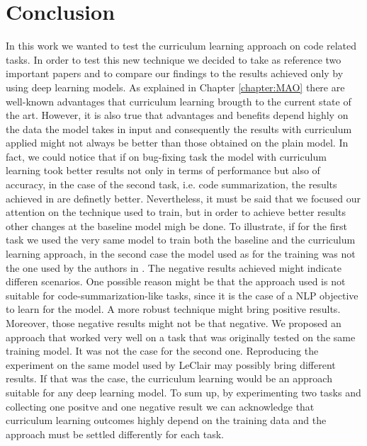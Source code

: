 \chapter{Conclusion}
In this work we wanted to test the curriculum learning approach on code related tasks.
In order to test this new technique we decided to take as reference two important papers and to compare 
our findings to the results achieved only by using deep learning models.
As explained in Chapter \ref{chapter:MAO} there are well-known advantages that curriculum learning
brougth to the current state of the art. However, it is also true that advantages and benefits depend highly on the data 
the model takes in input and consequently the results with curriculum applied might not always be better than 
those obtained on the plain model. 
In fact, we could notice that if on bug-fixing task the model with curriculum learning 
took better results not only in terms of performance but also of accuracy, 
in the case of the second task, i.e. code summarization, the results achieved in \cite{Leclair2020}
are definetly better.
Nevertheless, it must be said that we focused our attention on the technique used to train, but in order to achieve better 
results other changes at the baseline model migh be done. To illustrate, if for the first task we used the very same model 
to train both the baseline and the curriculum learning approach, in the second case the model used as for the training was not the 
one used by the authors in \cite{Leclair2020}. The negative results achieved might indicate differen scenarios. One possible reason might be that 
the approach used is not suitable for code-summarization-like tasks, since it is the case of a NLP objective to learn for the model.
A more robust technique might bring positive results.
Moreover, those negative results might not be that negative. We proposed an approach that worked very well on a task that was originally tested on the same 
training model. It was not the case for the second one. Reproducing the experiment on the same model used by LeClair \cite{Leclair2020} may possibly bring different results.
If that was the case, the curriculum learning would be an approach suitable for any deep learning model.
To sum up, by experimenting two tasks and collecting one positve and one negative result we can acknowledge that curriculum learning 
outcomes highly depend on the training data and the approach must be settled differently for each task.

